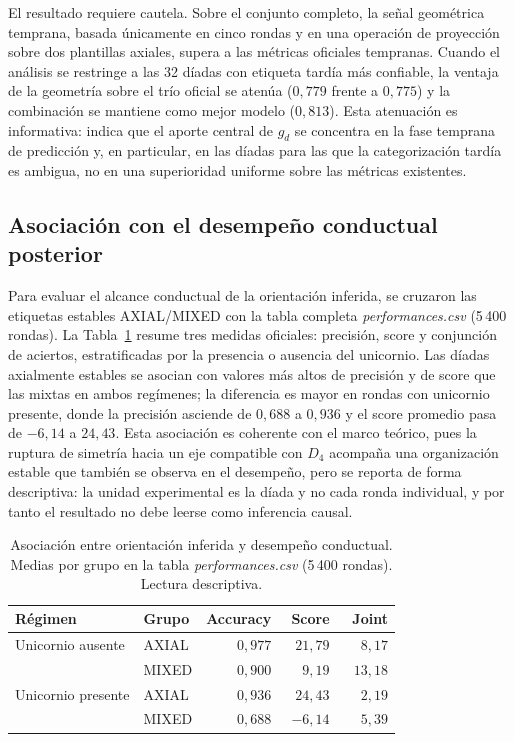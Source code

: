 \documentclass[journal]{IEEEtran}
\begin{document}
El resultado requiere cautela. Sobre el conjunto completo, la señal geométrica temprana, basada únicamente en cinco rondas y en una operación de proyección sobre dos plantillas axiales, supera a las métricas oficiales tempranas. Cuando el análisis se restringe a las 32 díadas con etiqueta tardía más confiable, la ventaja de la geometría sobre el trío oficial se atenúa ($0{,}779$ frente a $0{,}775$) y la combinación se mantiene como mejor modelo ($0{,}813$). Esta atenuación es informativa: indica que el aporte central de $g_d$ se concentra en la fase temprana de predicción y, en particular, en las díadas para las que la categorización tardía es ambigua, no en una superioridad uniforme sobre las métricas existentes.

\subsection{Asociación con el desempeño conductual posterior}\label{sec:res-transferencia}

Para evaluar el alcance conductual de la orientación inferida, se cruzaron las etiquetas estables AXIAL/MIXED con la tabla completa \emph{performances.csv} (5\,400 rondas). La Tabla~\ref{tab:transfer} resume tres medidas oficiales: precisión, score y conjunción de aciertos, estratificadas por la presencia o ausencia del unicornio. Las díadas axialmente estables se asocian con valores más altos de precisión y de score que las mixtas en ambos regímenes; la diferencia es mayor en rondas con unicornio presente, donde la precisión asciende de $0{,}688$ a $0{,}936$ y el score promedio pasa de $-6{,}14$ a $24{,}43$. Esta asociación es coherente con el marco teórico, pues la ruptura de simetría hacia un eje compatible con $D_4$ acompaña una organización estable que también se observa en el desempeño, pero se reporta de forma descriptiva: la unidad experimental es la díada y no cada ronda individual, y por tanto el resultado no debe leerse como inferencia causal.

\begin{table}[t]
\centering
\caption{Asociación entre orientación inferida y desempeño conductual. Medias por grupo en la tabla \emph{performances.csv} (5\,400 rondas). Lectura descriptiva.}
\label{tab:transfer}
\begin{tabular}{@{}llrrr@{}}
\toprule
\textbf{Régimen} & \textbf{Grupo} & \textbf{Accuracy} & \textbf{Score} & \textbf{Joint} \\
\midrule
Unicornio ausente  & AXIAL  & $0{,}977$ & $21{,}79$ & $\phantom{-}8{,}17$ \\
                   & MIXED  & $0{,}900$ & $\phantom{-}9{,}19$  & $13{,}18$ \\
\addlinespace
Unicornio presente & AXIAL  & $0{,}936$ & $24{,}43$ & $\phantom{-}2{,}19$ \\
                   & MIXED  & $0{,}688$ & $-6{,}14$ & $\phantom{-}5{,}39$ \\
\bottomrule
\end{tabular}
\end{table}
\end{document}
